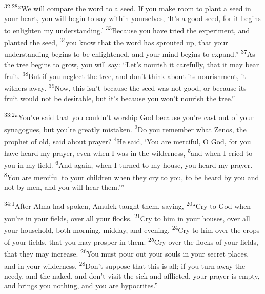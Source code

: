 \documentclass[openany,12pt,english]{book}
\newenvironment{para}{\par\pretolerance=100\tolerance=200\setlength{\emergencystretch}{0.6em}\relax}{\par}
\begin{document}
\begin{para}
    \textsuperscript{32:28}\thinspace{}“We will com\-pare the word to a seed. If you make room to plant a seed in your heart, you will be\-gin to say with\-in your\-selves, ‘It's a good seed, for it begins to en\-light\-en my un\-der\-stand\-ing.’
    \textsuperscript{33}\thinspace{}Be\-cause you have tried the ex\-per\-i\-ment, and planted the seed,
    \textsuperscript{34}\thinspace{}you know that the word has sprouted up, that your un\-der\-stand\-ing begins to be enlightened, and your mind begins to ex\-pand.”
    \textsuperscript{37}\thinspace{}As the tree begins to grow, you will say: “Let's nour\-ish it care\-ful\-ly, that it may bear fruit.
    \textsuperscript{38}\thinspace{}But if you ne\-glect the tree, and don't think a\-bout its nour\-ish\-ment, it with\-ers a\-way.
    \textsuperscript{39}\thinspace{}Now, this is\-n't be\-cause the seed was not good, or be\-cause its fruit would not be de\-sir\-a\-ble, but it's be\-cause you won't nour\-ish the tree.”
\end{para}

\begin{para}
    \textsuperscript{33:2}\thinspace{}“You've said that you could\-n't wor\-ship God be\-cause you're cast out of your synagogues, but you're great\-ly mis\-tak\-en.
    \textsuperscript{3}\thinspace{}Do you re\-mem\-ber what Zenos, the proph\-et of old, said a\-bout pray\-er?
    \textsuperscript{4}\thinspace{}He said, ‘You are mer\-ci\-ful, O God, for you have heard my pray\-er, e\-ven when I was in the wil\-der\-ness,
    \textsuperscript{5}\thinspace{}and when I cried to you in my field.
    \textsuperscript{6}\thinspace{}And a\-gain, when I turned to my house, you heard my pray\-er.
    \textsuperscript{8}\thinspace{}You are mer\-ci\-ful to your chil\-dren when they cry to you, to be heard by you and not by men, and you will hear them.’”
\end{para}

\begin{para}
    \textsuperscript{34:1}\thinspace{}Af\-ter Al\-ma had spo\-ken, Am\-u\-lek taught them, say\-ing,
    \textsuperscript{20}\thinspace{}“Cry to God when you're in your fields, o\-ver all your flocks.
    \textsuperscript{21}\thinspace{}Cry to him in your hous\-es, o\-ver all your house\-hold, both morn\-ing, mid\-day, and eve\-ning.
    \textsuperscript{24}\thinspace{}Cry to him o\-ver the crops of your fields, that you may pros\-per in them.
    \textsuperscript{25}\thinspace{}Cry o\-ver the flocks of your fields, that they may in\-crease.
    \textsuperscript{26}\thinspace{}You must pour out your souls in your se\-cret places, and in your wil\-der\-ness.
    \textsuperscript{28}\thinspace{}Don't sup\-pose that this is all; if you turn a\-way the needy, and the na\-ked, and don't vis\-it the sick and afflicted, your pray\-er is emp\-ty, and brings you noth\-ing, and you are hypocrites.”
\end{para}
\end{document}
